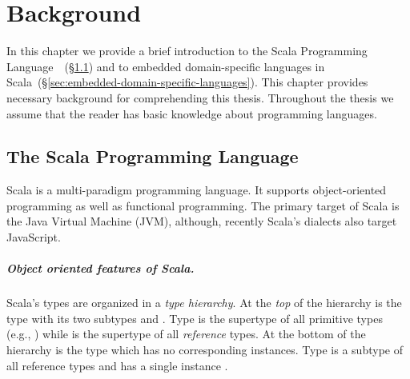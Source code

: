 


\chapter{Background}
\label{ch:background}

In this chapter we provide a brief introduction to the Scala Programming Language~\cite{odersky_scala_2004}~(\S \ref{sec:scala}) and to embedded domain-specific languages in Scala~(\S \ref{sec:embedded-domain-specific-languages}). %
This chapter provides necessary background for comprehending this thesis. Throughout the thesis we assume
 that the reader has basic knowledge about programming languages.


\section{The Scala Programming Language}
\label{sec:scala}

Scala is a multi-paradigm programming language. It supports object-oriented
programming as well as functional programming. The primary target of Scala is the
Java Virtual Machine (JVM), although, recently Scala's dialects also target JavaScript.

\paragraph{Object oriented features of Scala.} Scala's types are organized in a
 \emph{type hierarchy}. At the \emph{top} of the hierarchy is the  type
 with its two subtypes  and . Type  is the
 supertype of all primitive types (e.g., ) while  is the supertype
of all \emph{reference} types. At the bottom of the hierarchy is the type  which has no corresponding
 instances. Type  is a subtype of all reference types and has a single instance .

